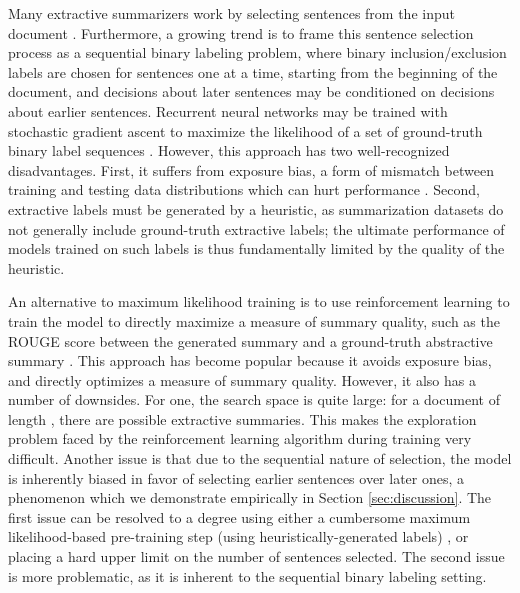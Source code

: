 \documentclass[11pt,a4paper]{article}
\begin{document}
Many extractive summarizers work by selecting sentences from the input document \citep{tra_ext1_luhn1958automatic,tra_ext3_mihalcea2004textrank,tra_ext5_wong2008extractive,ext1_kaageback2014extractive,ext2_2015Yin,ext3_cao2015learning,yasunaga2017graph}. Furthermore, a growing trend is to frame this sentence selection process as a sequential binary labeling problem, where binary inclusion/exclusion labels are chosen for sentences one at a time, starting from the beginning of the document, and decisions about later sentences may be conditioned on decisions about earlier sentences. Recurrent neural networks may be trained with stochastic gradient ascent to maximize the likelihood of a set of ground-truth binary label sequences \citep{ext4_cheng2016neural,ext5_summarunner}.
However, this approach has two well-recognized disadvantages. First, it suffers from exposure bias, a form of mismatch between training and testing data distributions which can hurt performance \citep{Ranzato2015SequenceLT, rl1_bahdanau+al-2017-actorcritic-iclr, abs5_paulus2017deep}. Second, extractive labels must be generated by a heuristic, as summarization datasets do not generally include ground-truth extractive labels; the ultimate performance of models trained on such labels is thus fundamentally limited by the quality of the heuristic.



An alternative to maximum likelihood training is to use reinforcement learning to train the model to directly maximize a measure of summary quality, such as the ROUGE score between the generated summary and a ground-truth abstractive summary \citep{DBLP:conf/aaai/WuH18}. This approach has become popular because it avoids exposure bias, and directly optimizes a measure of summary quality. However, it also has a number of downsides. For one, the search space is quite large: for a document of length , there are  possible extractive summaries. This makes the exploration problem faced by the reinforcement learning algorithm during training very difficult. Another issue is that due to the sequential nature of selection, the model is inherently biased in favor of selecting earlier sentences over later ones, a phenomenon which we demonstrate empirically in Section \ref{sec:discussion}. The first issue can be resolved to a degree using either a cumbersome maximum likelihood-based pre-training step (using heuristically-generated labels) \citep{DBLP:conf/aaai/WuH18}, or placing a hard upper limit on the number of sentences selected. The second issue is more problematic, as it is inherent to the sequential binary labeling setting.
\end{document}
